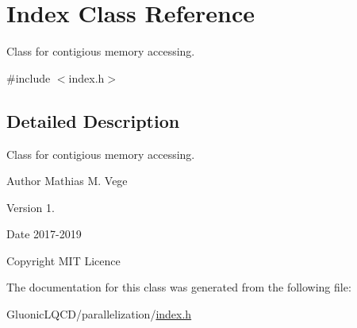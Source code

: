 \hypertarget{class_index}{}\section{Index Class Reference}
\label{class_index}


Class for contigious memory accessing.  




{\ttfamily \#include $<$index.\+h$>$}



\subsection{Detailed Description}
Class for contigious memory accessing. 

\begin{DoxyAuthor}{Author}
Mathias M. Vege 
\end{DoxyAuthor}
\begin{DoxyVersion}{Version}
1. 
\end{DoxyVersion}
\begin{DoxyDate}{Date}
2017-\/2019 
\end{DoxyDate}
\begin{DoxyCopyright}{Copyright}
M\+IT Licence 
\end{DoxyCopyright}


The documentation for this class was generated from the following file\+:\begin{DoxyCompactItemize}
\item 
Gluonic\+L\+Q\+C\+D/parallelization/\mbox{\hyperlink{index_8h}{index.\+h}}\end{DoxyCompactItemize}
